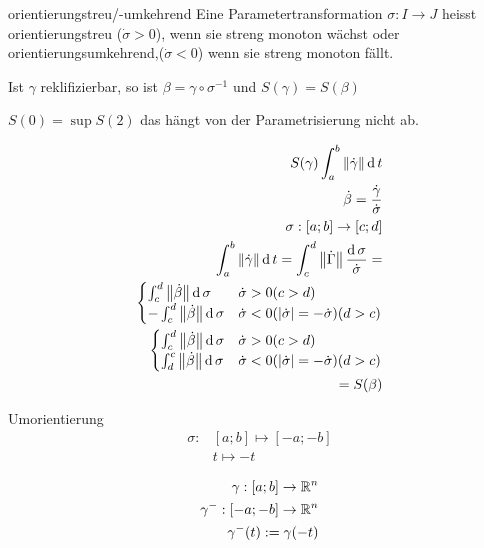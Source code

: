 \begin{Def}{orientierungstreu/-umkehrend}
  Eine Parametertransformation $\sigma:I\to J$ heisst orientierungstreu ($\dot\sigma>0$), wenn sie streng monoton wächst oder orientierungsumkehrend,($\dot\sigma<0$) wenn sie streng monoton fällt.
\end{Def}
\begin{Bem}
  Ist $\gamma$ reklifizierbar, so ist $\beta=\gamma\circ\sigma^{-1}$ und $S(\gamma)=S(\beta)$
\end{Bem}
\begin{Bew}
  $S(0)=\sup S(2)$ das hängt von der Parametrisierung nicht ab.
\end{Bew}
\begin{Bew}
  \begin{align*}
    S(\gamma)\int^b_a\left\| \dot\gamma \right\|\operatorname{d} t\\
    \dot\beta=\frac{\dot\gamma}{\dot\sigma}\\
    \sigma:[a;b]\to[c;d]\\
    \int^b_a\left\| \dot\gamma \right\|\operatorname{d} t=\int^d_c\left\| \dot\Gamma \right\|\frac{\operatorname{d} \sigma}{\dot\sigma}=\\
    \begin{cases}
      \int^d_c\left\| \dot\beta \right\|\operatorname{d} \sigma&\dot\sigma>0 (c>d)\\
      -\int^d_c\left\| \dot\beta \right\|\operatorname{d} \sigma&\dot\sigma<0 (\left| \dot\sigma \right|=-\dot\sigma) (d>c)
    \end{cases}\\
    \begin{cases}
      \int^d_c\left\| \dot\beta \right\|\operatorname{d} \sigma&\dot\sigma>0 (c>d)\\
      \int^c_d\left\| \dot\beta \right\|\operatorname{d} \sigma&\dot\sigma<0 (\left| \dot\sigma \right|=-\dot\sigma) (d>c)
    \end{cases}\\
    =S(\beta)
  \end{align*}
\end{Bew}
\begin{Def}{Umorientierung}
  \begin{align*}
    \sigma:&[a;b]\mapsto[-a;-b]\\
    &t\mapsto -t
  \end{align*}
\end{Def}
\begin{Not}
  \begin{align*}
    \gamma:[a;b]\to\mathbb{R}^n\\
    \gamma^-:[-a;-b]\to\mathbb{R}^n\\
    \gamma^-(t):=\gamma(-t)
  \end{align*}
\end{Not}
